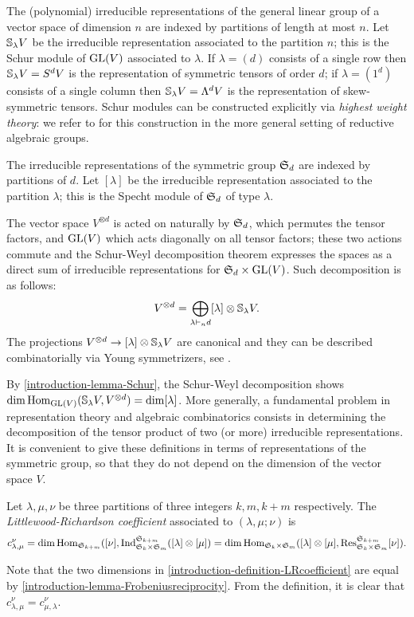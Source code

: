 The (polynomial) irreducible representations of the general linear group of a vector space of dimension $n$ are indexed by partitions of length at most $n$. Let $\mathbb{S}_\lambda V$ be the irreducible representation associated to the partition $n$; this is the Schur module of $\mathrm{GL}(V)$ associated to $\lambda$. If $\lambda = (d)$ consists of a single row then $\mathbb{S}_\lambda V = S^d V$ is the representation of symmetric tensors of order $d$; if $\lambda = (1^d)$ consists of a single column then $\mathbb{S}_\lambda V = \Lambda^d V$ is the representation of skew-symmetric tensors. Schur modules can be constructed explicitly via \emph{highest weight theory}: we refer to \cite{FH91} for this construction in the more general setting of reductive algebraic groups.

The irreducible representations of the symmetric group $\mathfrak{S}_d$ are indexed by partitions of $d$. Let $[\lambda]$ be the irreducible representation associated to the partition $\lambda$; this is the Specht module of $\mathfrak{S}_d$ of type $\lambda$. 

The vector space $V^{\otimes d}$ is acted on naturally by $\mathfrak{S}_d$, which permutes the tensor factors, and $\mathrm{GL}(V)$ which acts diagonally on all tensor factors; these two actions commute and the Schur-Weyl decomposition theorem expresses the spaces as a direct sum of irreducible representations for $\mathfrak{S}_d \times \mathrm{GL}(V)$. Such decomposition is as follows:
\[
V^{\otimes d} = \bigoplus_{\lambda \vdash_n d} [\lambda] \otimes \mathbb{S}_{\lambda} V.
\]
The projections $V^{\otimes d} \to [\lambda] \otimes \mathbb{S}_\lambda V$ are canonical and they can be described combinatorially via Young symmetrizers, see \cite[Lecture 4]{FH91}.

By \ref{introduction-lemma-Schur}, the Schur-Weyl decomposition shows $\dim \operatorname{Hom}_{\mathrm{GL}(V)} ( \mathbb{S}_\lambda V, V^{\otimes d}) = \dim [\lambda]$. More generally, a fundamental problem in representation theory and algebraic combinatorics consists in determining the decomposition of the tensor product of two (or more) irreducible representations. It is convenient to give these definitions in terms of representations of the symmetric group, so that they do not depend on the dimension of the vector space $V$.

\begin{definition}
 \label{introduction-definition-LRcoefficient}
 Let $\lambda,\mu,\nu$ be three partitions of three integers $k,m, k+m$ respectively. The {\it Littlewood-Richardson coefficient} associated to $(\lambda,\mu;\nu)$ is 
 \[
c^\nu_{\lambda,\mu} = 
\dim \operatorname{Hom}_{\mathfrak{S}_{k+m}} ([\nu], \operatorname{Ind}_{\mathfrak{S}_k \times \mathfrak{S}_m}^{\mathfrak{S}_{k+m}} ([\lambda] \otimes [\mu]) = 
\dim \operatorname{Hom}_{\mathfrak{S}_{k} \times \mathfrak{S}_m} ([\lambda] \otimes [\mu] , \operatorname{Res}_{\mathfrak{S}_k \times \mathfrak{S}_m}^{\mathfrak{S}_{k+m}} [\nu]).
\]
\end{definition}
Note that the two dimensions in \ref{introduction-definition-LRcoefficient} are equal by \ref{introduction-lemma-Frobeniusreciprocity}. From the definition, it is clear that $c^\nu_{\lambda,\mu} = c^\nu_{\mu,\lambda}$. 

